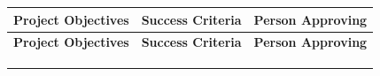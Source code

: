 \documentclass[10pt,letterpaper]{article}
\renewcommand\arraystretch{1.25}
\begin{document}
\begin{center}
\begingroup
\setlength\tabcolsep{2.0pt}
\footnotesize
\renewcommand\arraystretch{1.55}
\begin{longtable}{|>{\raggedright\arraybackslash}p{2.120in}|>{\raggedright\arraybackslash}p{2.120in}|>{\raggedright\arraybackslash}p{2.120in}|}
\hline
\rowcolor{light}
\textbf{Project Objectives} & \textbf{Success Criteria} & \textbf{Person Approving} \\ \hline
\endfirsthead
\hline\rowcolor{light} \textbf{Project Objectives} & \textbf{Success Criteria} & \textbf{Person Approving} \\ \hline
\endhead
\rule{0pt}{11pt}\hspace{0pt} & \rule{0pt}{11pt}\hspace{0pt} & \rule{0pt}{11pt}\hspace{0pt} \\ \hline
\rule{0pt}{11pt}\hspace{0pt} & \rule{0pt}{11pt}\hspace{0pt} & \rule{0pt}{11pt}\hspace{0pt} \\ \hline
\rule{0pt}{11pt}\hspace{0pt} & \rule{0pt}{11pt}\hspace{0pt} & \rule{0pt}{11pt}\hspace{0pt} \\ \hline
\end{longtable}
\endgroup
\end{center}
\end{document}
